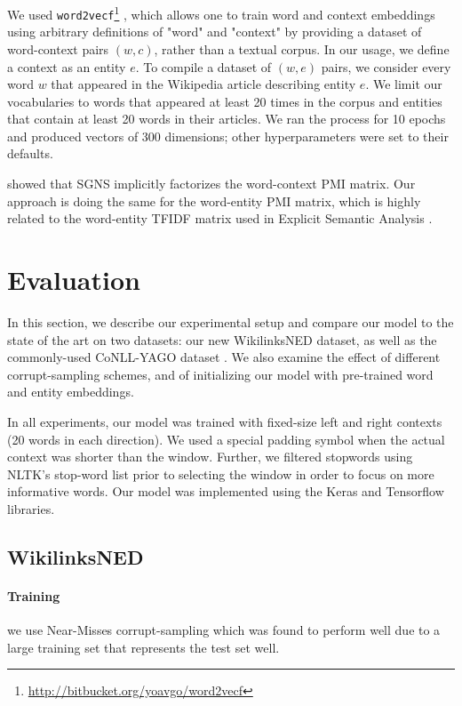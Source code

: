 \documentclass[11pt,letterpaper]{article}
\begin{document}
	We used \texttt{word2vecf}\footnote{\url{http://bitbucket.org/yoavgo/word2vecf}} \cite{levy2014dependency}, which allows one to train word and context embeddings using arbitrary definitions of "word" and "context" by providing a dataset of word-context pairs $(w,c)$, rather than a textual corpus. In our usage, we define a context as an entity $e$. To compile a dataset of $(w,e)$ pairs, we consider every word $w$ that appeared in the Wikipedia article describing entity $e$. We limit our vocabularies to words that appeared at least 20 times in the corpus and entities that contain at least 20 words in their articles. We ran the process for 10 epochs and produced vectors of 300 dimensions; other hyperparameters were set to their defaults.
	
	 showed that SGNS implicitly factorizes the word-context PMI matrix. Our approach is doing the same for the word-entity PMI matrix, which is highly related to the word-entity TFIDF matrix used in Explicit Semantic Analysis \cite{gabrilovich2007computing}.
	
	\section{Evaluation}
	\label{experiments}
	
	In this section, we describe our experimental setup and compare our model to the state of the art on two datasets: our new WikilinksNED dataset, as well as the commonly-used CoNLL-YAGO dataset \cite{hoffart2011robust}. We also examine the effect of different corrupt-sampling schemes, and of initializing our model with pre-trained word and entity embeddings.
	
	In all experiments, our model was trained with fixed-size left and right contexts (20 words in each direction). We used a special padding symbol when the actual context was shorter than the window. Further, we filtered stopwords using NLTK's stop-word list prior to selecting the window in order to focus on more informative words. Our model was implemented using the Keras \cite{chollet2015} and Tensorflow \cite{tensorflow2015-whitepaper} libraries.
	
	\subsection{WikilinksNED}
	
	\paragraph{Training} we use Near-Misses corrupt-sampling which was found to perform well due to a large training set that represents the test set well.
	
\end{document}
